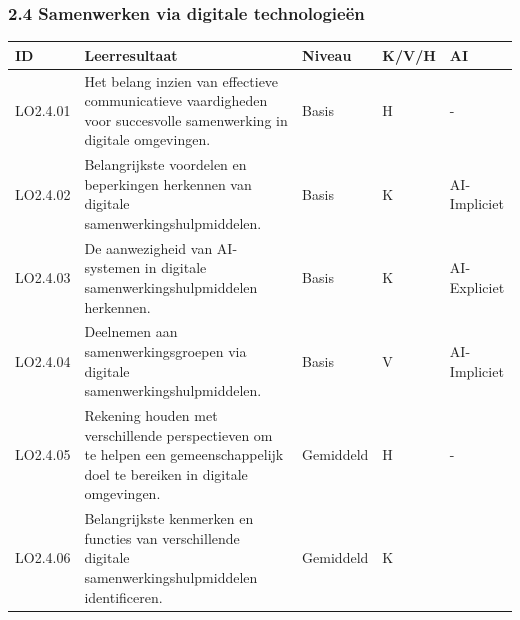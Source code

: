 \documentclass[
  dutch,
  letterpaper,
  DIV=11,
  numbers=noendperiod]{scrartcl}
\begin{document}
\subsubsection{2.4 Samenwerken via digitale
technologieën}\label{samenwerken-via-digitale-technologieuxebn}

\begin{longtable}[]{@{}
  >{\centering\arraybackslash}p{}
  >{\centering\arraybackslash}p{}
  >{\centering\arraybackslash}p{}
  >{\centering\arraybackslash}p{}
  >{\centering\arraybackslash}p{}@{}}
\toprule\noalign{}
\begin{minipage}[b]{\linewidth}\centering
ID
\end{minipage} & \begin{minipage}[b]{\linewidth}\centering
Leerresultaat
\end{minipage} & \begin{minipage}[b]{\linewidth}\centering
Niveau
\end{minipage} & \begin{minipage}[b]{\linewidth}\centering
K/V/H
\end{minipage} & \begin{minipage}[b]{\linewidth}\centering
AI
\end{minipage} \\
\midrule\noalign{}
\endhead
\bottomrule\noalign{}
\endlastfoot
LO2.4.01 & Het belang inzien van effectieve communicatieve vaardigheden
voor succesvolle samenwerking in digitale omgevingen. & Basis & H & - \\
LO2.4.02 & Belangrijkste voordelen en beperkingen herkennen van digitale
samenwerkingshulpmiddelen. & Basis & K & AI-Impliciet \\
LO2.4.03 & De aanwezigheid van AI-systemen in digitale
samenwerkingshulpmiddelen herkennen. & Basis & K & AI-Expliciet \\
LO2.4.04 & Deelnemen aan samenwerkingsgroepen via digitale
samenwerkingshulpmiddelen. & Basis & V & AI-Impliciet \\
LO2.4.05 & Rekening houden met verschillende perspectieven om te helpen
een gemeenschappelijk doel te bereiken in digitale omgevingen. &
Gemiddeld & H & - \\
LO2.4.06 & Belangrijkste kenmerken en functies van verschillende
digitale samenwerkingshulpmiddelen identificeren. & Gemiddeld & K &

\end{longtable}
\end{document}
